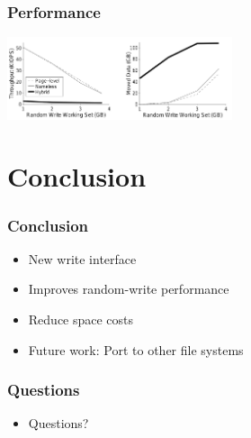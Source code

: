 \documentclass{beamer}
\begin{document}
\begin{frame}
  \frametitle{Performance}
  \begin{center}
  \includegraphics[width=250px]{performance.png}
  \end{center}
\end{frame}

\section{Conclusion}
\begin{frame}
  \frametitle{Conclusion}
  \begin{itemize}
    \item New write interface
    \item Improves random-write performance
    \item Reduce space costs
    \item Future work: Port to other file systems
  \end{itemize}
\end{frame}

\begin{frame}
  \frametitle{Questions}
  \begin{itemize}
    \item Questions?
  \end{itemize}
\end{frame}
\end{document}
